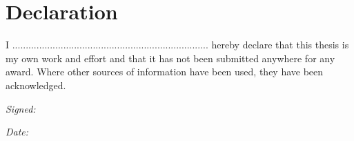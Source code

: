 \chapter*{Declaration}

I ......................................................................... hereby declare that this thesis is my own work and effort and that it has not been submitted anywhere for any award. Where other sources of information have been used, they have been acknowledged.

\vspace{2cm} %
\begin{flushright}
\textit{Signed:} \underline{\hspace{6cm}} %
\end{flushright}

\vspace{0.5cm}
\begin{flushright}
\textit{Date:} \underline{\hspace{4cm}} %
\end{flushright}

